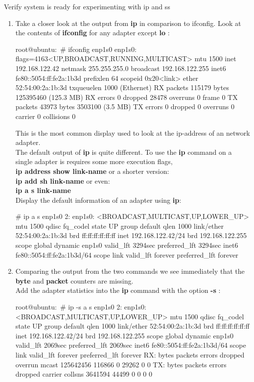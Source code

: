 \begin{Lab}
\begin{exe} {Verify system is ready for experimenting with ip and ss}
\begin{sol}
\begin{enumerate}
	\item 
		Take a closer look at the output from \textbf{ip} in comparison to 
		      ifconfig. Look at the contents of \textbf{ifconfig} for any
		      adapter except \textbf{lo} : 
	\begin{raw}
root@ubuntu:~# ifconfig enp1s0
enp1s0: flags=4163<UP,BROADCAST,RUNNING,MULTICAST>  mtu 1500
        inet 192.168.122.42  netmask 255.255.255.0  broadcast 192.168.122.255
        inet6 fe80::5054:ff:fe2a:1b3d  prefixlen 64  scopeid 0x20<link>
        ether 52:54:00:2a:1b:3d  txqueuelen 1000  (Ethernet)
        RX packets 115179  bytes 125395460 (125.3 MB)
        RX errors 0  dropped 28478  overruns 0  frame 0
        TX packets 43973  bytes 3503100 (3.5 MB)
        TX errors 0  dropped 0 overruns 0  carrier 0  collisions 0
	\end{raw}
		This is the most common display used to look at the ip-address of an network adapter.\\ 
		      The default output of \textbf{ip} is quite different. To use the \textbf{ip}
		      command on a single adapter is requires some more execution flags, \\ 
		      \textbf{ip address show link-name} or a shorter version: \\ 
		      \textbf{ip add sh link-name} or even: \\
		      \textbf{ip a s link-name} \\ 
		      Display the default information of an adapter using \textbf{ip}:
	\begin{raw}
# ip a s  enp1s0
2: enp1s0: <BROADCAST,MULTICAST,UP,LOWER_UP> mtu 1500 qdisc fq_codel state UP group default qlen 1000
    link/ether 52:54:00:2a:1b:3d brd ff:ff:ff:ff:ff:ff
    inet 192.168.122.42/24 brd 192.168.122.255 scope global dynamic enp1s0
       valid_lft 3294sec preferred_lft 3294sec
    inet6 fe80::5054:ff:fe2a:1b3d/64 scope link 
       valid_lft forever preferred_lft forever
	\end{raw}
	
	\item 
		Comparing the output from the two commands we see immediately 
		that the \textbf{byte} and \textbf{packet} counters are missing. \\
		Add the adapter statistics into the \textbf{ip} command with the 
		option \textbf{-s} : 
	\begin{raw}
root@ubuntu:~# ip -s a s  enp1s0
2: enp1s0: <BROADCAST,MULTICAST,UP,LOWER_UP> mtu 1500 qdisc fq_codel state UP group default qlen 1000
    link/ether 52:54:00:2a:1b:3d brd ff:ff:ff:ff:ff:ff
    inet 192.168.122.42/24 brd 192.168.122.255 scope global dynamic enp1s0
       valid_lft 2069sec preferred_lft 2069sec
    inet6 fe80::5054:ff:fe2a:1b3d/64 scope link 
       valid_lft forever preferred_lft forever
    RX: bytes  packets  errors  dropped overrun mcast   
    125642456  116866   0       29262   0       0       
    TX: bytes  packets  errors  dropped carrier collsns 
    3641594    44499    0       0       0       0   
		\end{raw} 


\end{enumerate}
\end{sol}
\end{exe}
\end{Lab}
